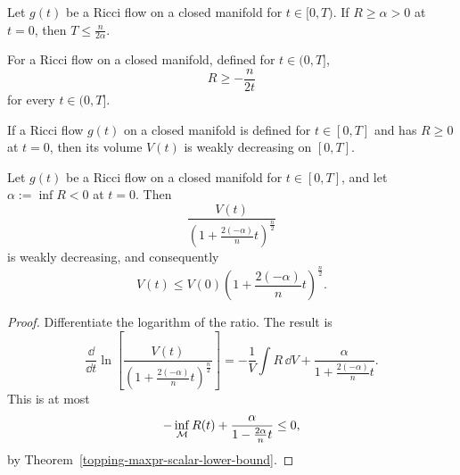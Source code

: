 \begin{corollary}
\label{topping-maxpr-finite-time-blowup}
Let $g(t)$ be a Ricci flow on a closed manifold for $t\in[0,T)$. If
$R\geq\alpha>0$ at $t=0$, then $T\leq\frac{n}{2\alpha}$.
\end{corollary}

\begin{corollary}
\label{topping-maxpr-negative-scalar-lower-bound}
For a Ricci flow on a closed manifold, defined for $t\in(0,T]$,
\[
R\geq-\frac{n}{2t}
\]
for every $t\in(0,T]$.
\end{corollary}

\begin{corollary}
\label{topping-maxpr-volume-decreases}
\leanok
If a Ricci flow $g(t)$ on a closed manifold is defined for $t\in[0,T]$ and has
$R\geq0$ at $t=0$, then its volume $V(t)$ is weakly decreasing on $[0,T]$.
\end{corollary}

\begin{corollary}
\label{topping-maxpr-volume-ratio}

Let $g(t)$ be a Ricci flow on a closed manifold for $t\in[0,T]$, and let
$\alpha:=\inf R<0$ at $t=0$. Then
\[
\frac{V(t)}{\left(1+\frac{2(-\alpha)}{n}t\right)^{\frac n2}}
\]
is weakly decreasing, and consequently
\[
V(t)\leq V(0)\left(1+\frac{2(-\alpha)}{n}t\right)^{\frac n2}.
\]
\end{corollary}

\begin{proof}
\sketch Differentiate the logarithm of the ratio. The result is
\[
\frac{\dd}{\dd t}\ln\!\left[
\frac{V(t)}{\left(1+\frac{2(-\alpha)}{n}t\right)^{\frac n2}}
\right]
=-\frac{1}{V}\int R\,\dd V
 +\frac{\alpha}{1+\frac{2(-\alpha)}{n}t}.
\]
This is at most
\[
-\inf_{\mathcal{M}}R(t)+\frac{\alpha}{1-\frac{2\alpha}{n}t}\leq0,
\]
by Theorem~\ref{topping-maxpr-scalar-lower-bound}.
\end{proof}

